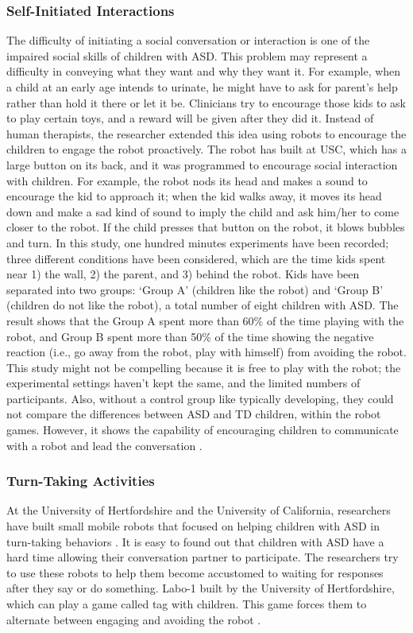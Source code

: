 \subsubsection{Self-Initiated Interactions}
The difficulty of initiating a social conversation or interaction is one of the impaired social skills 
of children with ASD. This problem may represent a difficulty in conveying what they want and why 
they want it. For example, when a child at an early age intends to urinate, he might have to ask for 
parent’s help rather than hold it there or let it be. Clinicians try to encourage those kids to ask 
to play certain toys, and a reward will be given after they did it. Instead of human therapists, 
the researcher extended this idea using robots to encourage the children to engage the robot proactively. 
The robot has built at USC, which has a large button on its back, and it was programmed to 
encourage social interaction with children. For example, the robot nods its head and makes a 
sound to encourage the kid to approach it; when the kid walks away, it moves its head down and 
make a sad kind of sound to imply the child and ask him/her to come closer to the robot. If the child 
presses that button on the robot, it blows bubbles and turn. In this study, one hundred minutes 
experiments have been recorded; three different conditions have been considered, which are the time 
kids spent near 1) the wall, 2) the parent, and 3) behind the robot. Kids have been separated into two 
groups: ‘Group A’ (children like the robot) and ‘Group B’ (children do not like the robot), a total 
number of eight children with ASD. The result shows that the Group A spent more than 60\% of the 
time playing with the robot, and Group B spent more than 50\% of the time showing the negative 
reaction (i.e., go away from the robot, play with himself) from avoiding the robot. This study might not 
be compelling because it is free to play with the robot; the experimental settings haven’t 
kept the same, and the limited numbers of participants. Also, without a control group like typically 
developing, they could not compare the differences between ASD and TD children, within the robot games. 
However, it shows the capability of encouraging children to communicate with a robot and lead the 
conversation \cite{feil2008robot}.\\

\subsubsection{Turn-Taking Activities}
At the University of Hertfordshire and the University of California, researchers have built small 
mobile robots that focused on helping children with ASD in turn-taking behaviors \cite{feil2008robot, dautenhahn2004towards}. It 
is easy to found out that children with ASD have a hard time allowing their conversation partner 
to participate. The researchers try to use these robots to help them become accustomed to waiting 
for responses after they say or do something. Labo-1 built by the University of Hertfordshire, 
which can play a game called tag with children. This game forces them to alternate between 
engaging and avoiding the robot \cite{dautenhahn2004towards}.\\

